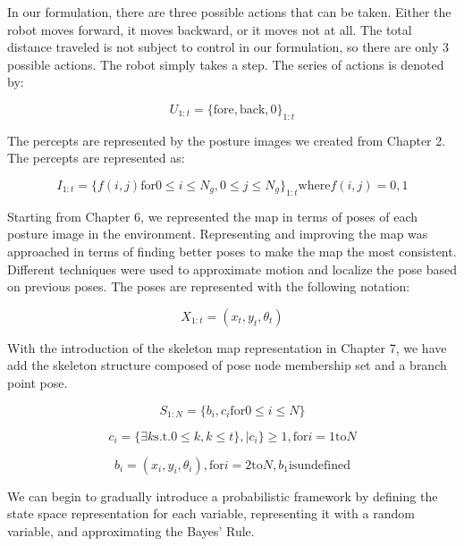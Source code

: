 In our formulation, there are three possible actions that can be taken. Either the robot moves forward, it moves backward, or it moves not at all. The total distance traveled is not subject to control in our formulation, so there are only 3 possible actions. The robot simply takes a step. The series of actions is denoted by:


\begin{equation}
U_{1:t} = \{\mathrm{fore}, \mathrm{back}, 0\}_{1:t}
\end{equation}


The percepts are represented by the posture images we created from Chapter 2. The percepts are represented as: 


\begin{equation}
I_{1:t} = \{ f(i,j) \mathrm{for} 0 \leq i \leq N_g, 0  \leq j \leq N_g \}_{1:t} \mathrm{where} f(i,j) = {0, 1}
\end{equation}


Starting from Chapter 6, we represented the map in terms of poses of each posture image in the environment. Representing and improving the map was approached in terms of finding better poses to make the map the most consistent. Different techniques were used to approximate motion and localize the pose based on previous poses. The poses are represented with the following notation:


\begin{equation}
X_{1:t} = ( x_t, y_t, \theta_t )
\end{equation}


With the introduction of the skeleton map representation in Chapter 7, we have add the skeleton structure composed of pose node membership set and a branch point pose.


\begin{equation}
S_{1:N} = \{b_i, c_i  \mathrm{for} 0 \leq i \leq N \}
\end{equation}

\begin{equation}
c_i = \{\exists k \mathrm{s.t.} 0 \leq k, k \leq t\}, |c_i\} \geq 1, \mathrm{for} i = 1 \mathrm{to} N
\end{equation}
 
\begin{equation}
b_i = (x_i,y_i,\theta_i), \mathrm{for} i = 2 \mathrm{to} N, b_1 \mathrm{is undefined}
\end{equation}


We can begin to gradually introduce a probabilistic framework by defining the state space representation for each variable, representing it with a random variable, and approximating the Bayes' Rule.

